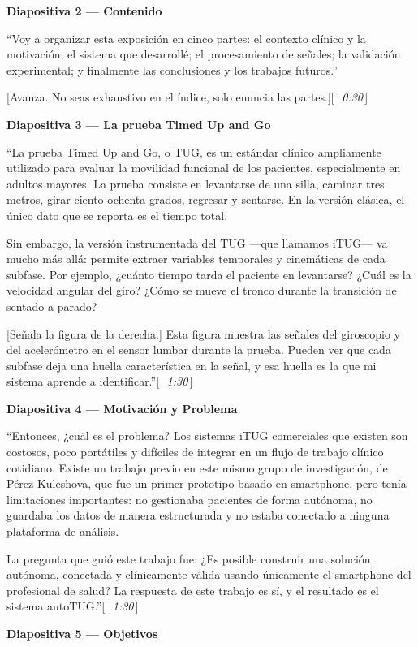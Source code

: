 \documentclass[12pt]{article}
\newcommand{\diap}[2]{%
  \begin{slidebox}
    \textbf{\color{slateblue}Diapositiva #1 — #2}
  \end{slidebox}%
}
\newcommand{\tiempo}[1]{\hfill{\small\color{timebox}[\,\textit{~#1}\,]}}
\begin{document}
\diap{2}{Contenido}

``Voy a organizar esta exposición en cinco partes: el contexto clínico y la motivación; el sistema que desarrollé; el procesamiento de señales; la validación experimental; y finalmente las conclusiones y los trabajos futuros.''

[Avanza. No seas exhaustivo en el índice, solo enuncia las partes.]\tiempo{0:30}

\diap{3}{La prueba Timed Up and Go}

``La prueba Timed Up and Go, o TUG, es un estándar clínico ampliamente utilizado para evaluar la movilidad funcional de los pacientes, especialmente en adultos mayores. La prueba consiste en levantarse de una silla, caminar tres metros, girar ciento ochenta grados, regresar y sentarse. En la versión clásica, el único dato que se reporta es el tiempo total.

Sin embargo, la versión instrumentada del TUG —que llamamos iTUG— va mucho más allá: permite extraer variables temporales y cinemáticas de cada subfase. Por ejemplo, ¿cuánto tiempo tarda el paciente en levantarse? ¿Cuál es la velocidad angular del giro? ¿Cómo se mueve el tronco durante la transición de sentado a parado?

[Señala la figura de la derecha.] Esta figura muestra las señales del giroscopio y del acelerómetro en el sensor lumbar durante la prueba. Pueden ver que cada subfase deja una huella característica en la señal, y esa huella es la que mi sistema aprende a identificar.''\tiempo{1:30}

\diap{4}{Motivación y Problema}

``Entonces, ¿cuál es el problema? Los sistemas iTUG comerciales que existen son costosos, poco portátiles y difíciles de integrar en un flujo de trabajo clínico cotidiano. Existe un trabajo previo en este mismo grupo de investigación, de Pérez Kuleshova, que fue un primer prototipo basado en smartphone, pero tenía limitaciones importantes: no gestionaba pacientes de forma autónoma, no guardaba los datos de manera estructurada y no estaba conectado a ninguna plataforma de análisis.

La pregunta que guió este trabajo fue: ¿Es posible construir una solución autónoma, conectada y clínicamente válida usando únicamente el smartphone del profesional de salud? La respuesta de este trabajo es sí, y el resultado es el sistema autoTUG.''\tiempo{1:30}

\diap{5}{Objetivos}
\end{document}
